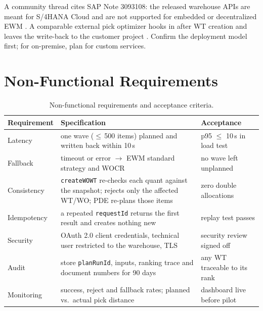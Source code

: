 \documentclass[11pt,a4paper]{article}
\newcommand{\api}[1]{\texttt{#1}}
\begin{document}
A community thread cites SAP Note 3093108: the released warehouse APIs are meant for S/4HANA Cloud and are not supported for
embedded or decentralized EWM \cite{note}. A comparable external pick optimizer hooks in after WT creation and leaves the
write-back to the customer project \cite{optioryx}. Confirm the deployment model first; for on-premise, plan for custom services.

\section{Non-Functional Requirements}
\label{sec:nfr}
\begin{table}[H]
\centering\small
\begin{tabularx}{\linewidth}{@{}P{3.0cm}L P{3.6cm}@{}}
\toprule
\textbf{Requirement} & \textbf{Specification} & \textbf{Acceptance} \\
\midrule
Latency & one wave ($\le$\,500 items) planned and written back within 10\,s & p95 $\le$ 10\,s in load test \\
Fallback & timeout or error $\rightarrow$ EWM standard strategy and WOCR & no wave left unplanned \\
Consistency & \api{createWOWT} re-checks each quant against the snapshot; rejects only the affected WT/WO; PDE re-plans those items & zero double allocations \\
Idempotency & a repeated \texttt{requestId} returns the first result and creates nothing new & replay test passes \\
Security & OAuth 2.0 client credentials, technical user restricted to the warehouse, TLS & security review signed off \\
Audit & store \texttt{planRunId}, inputs, ranking trace and document numbers for 90 days & any WT traceable to its rank \\
Monitoring & success, reject and fallback rates; planned vs.\ actual pick distance & dashboard live before pilot \\
\bottomrule
\end{tabularx}
\caption{Non-functional requirements and acceptance criteria.}
\label{tab:nfr}
\end{table}

\end{document}
